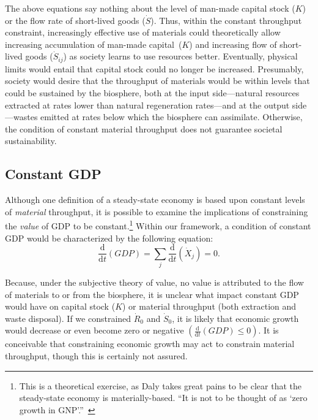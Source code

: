 The above equations say nothing about the level 
of man-made capital stock ($K$)
or the flow rate of short-lived goods ($\dot{S}$).
Thus, within the constant throughput constraint,
increasingly effective use of materials could
theoretically allow increasing accumulation
of man-made capital~($K$) 
and increasing flow of short-lived goods ($\dot{S}_{ij}$)
as society learns to use resources better.
Eventually,
physical limits would entail that capital
stock could no longer be increased.
Presumably,
society would desire that the throughput of
materials would be within levels that could
be sustained by the biosphere,
both at the input side---natural 
resources extracted at rates lower
than natural regeneration rates---and 
at the output side---wastes emitted 
at rates below which
the biosphere can assimilate.
Otherwise, the condition of constant material throughput
does not guarantee societal sustainability.


\subsection{Constant GDP}

Although one definition of a steady-state economy is
based upon constant levels of \emph{material} throughput,
it is possible to examine the implications of constraining the \emph{value} of 
GDP to be constant.\footnote{This is a theoretical exercise, 
	as Daly takes great pains to be clear that 
	the steady-state economy is materially-based. ``It is not
	to be thought of as `zero growth in GNP'.''~\cite[p. 32]{Daly1997}}
Within our framework,
a condition of constant GDP would be
characterized by the following equation:
%
\begin{equation}\label{eq:const_GDP}
	\frac{\mathrm{d}}{\mathrm{d}t}\left(GDP\right)
	=	\sum\limits_{j}\frac{\mathrm{d}}{\mathrm{d}t}\left(\dot{X}_{j}\right)
	= 0.
\end{equation}

Because,
under the subjective theory of value,
no value is attributed to the flow of materials
to or from the biosphere,
it is unclear what impact constant GDP would have
on capital stock ($K$)
or material throughput
(both extraction and waste disposal).
If we constrained $\dot{R}_{0}$ and
$\dot{S}_{0}$, 
it is likely that economic growth would 
decrease or even become zero or negative
$\left(\frac{\mathrm{d}}{\mathrm{d}t}\left(GDP\right) \leq 0\right)$.
It is conceivable that constraining
economic growth may act to constrain
material throughput,
though this is certainly not assured.

